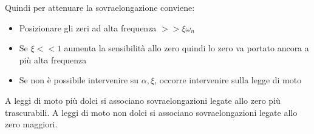 Quindi per attenuare la sovraelongazione conviene:
\begin{itemize}
    \item Posizionare gli zeri ad alta frequenza \(>> \xi \omega_n\)
    \item Se \(\xi << 1\) aumenta la sensibilità allo zero quindi lo zero va portato ancora  a più alta frequenza
    \item Se non è possibile intervenire su \(\alpha, \xi\), occorre intervenire sulla legge di moto
\end{itemize}

A leggi di moto più dolci si associano sovraelongazioni legate allo zero più trascurabili. A leggi di moto non dolci si associano sovraelongazioni legate allo zero maggiori.